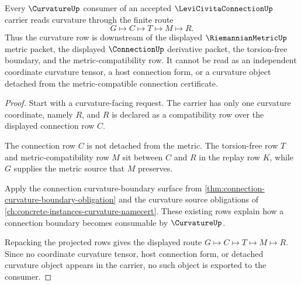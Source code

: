\begin{theorem}
\label{thm:levi-civita-connection-curvature-compatibility}
Every $\CurvatureUp$ consumer of an accepted $\LeviCivitaConnectionUp$ carrier reads curvature through the finite route
$$
G \longmapsto C \longmapsto T \longmapsto M \longmapsto R .
$$
Thus the curvature row is downstream of the displayed $\RiemannianMetricUp$ metric packet, the displayed $\ConnectionUp$ derivative packet, the torsion-free boundary, and the metric-compatibility row. It cannot be read as an independent coordinate curvature tensor, a host connection form, or a curvature object detached from the metric-compatible connection certificate.
\end{theorem}
\begin{proof}
Start with a curvature-facing request. The carrier has only one curvature coordinate, namely $R$, and $R$ is declared as a compatibility row over the displayed connection row $C$.

The connection row $C$ is not detached from the metric. The torsion-free row $T$ and metric-compatibility row $M$ sit between $C$ and $R$ in the replay row $K$, while $G$ supplies the metric source that $M$ preserves.

Apply the connection curvature-boundary surface from \autoref{thm:connection-curvature-boundary-obligation} and the curvature source obligations of \autoref{ch:concrete-instances-curvature-namecert}. These existing rows explain how a connection boundary becomes consumable by $\CurvatureUp$.

Repacking the projected rows gives the displayed route $G \mapsto C \mapsto T \mapsto M \mapsto R$. Since no coordinate curvature tensor, host connection form, or detached curvature object appears in the carrier, no such object is exported to the consumer.
\end{proof}


